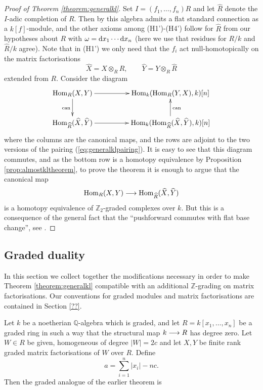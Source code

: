 \documentclass{compositio}
\theoremstyle{definition}
\numberwithin{equation}{section}
\def\can{\operatorname{can}}
\def\Hom{\operatorname{Hom}}
\begin{document}
\begin{proof}[Proof of Theorem \ref{theorem:generalkl}] Set $I = (f_1,\ldots,f_n)R$ and let $\widehat{R}$ denote the $I$-adic completion of $R$. Then by \cite{??} this algebra admits a flat standard connection as a $k[f]$-module, and the other axioms among (H1')-(H4') follow for $\widehat{R}$ from our hypotheses about $R$ with $\omega = \mathrm{d} x_1 \cdots \mathrm{d} x_n$ (here we use that residues for $R/k$ and $\widehat{R}/k$ agree). Note that in (H1') we only need that the $f_i$ act null-homotopically on the matrix factorisations
\[
\widehat{X} = X \otimes_R \widehat{R}, \qquad \widehat{Y} = Y \otimes_R \widehat{R}
\]
extended from $R$. Consider the diagram
\[
\xymatrix@C+2pc{
\Hom_R(X,Y) \ar[d]_{\can} \ar[r] & \Hom_k( \Hom_R(Y,X), k )[n]\\
\Hom_{\widehat{R}}(\widehat{X}, \widehat{Y}) \ar[r] & \Hom_k( \Hom_{\widehat{R}}(\widehat{X}, \widehat{Y}), k)[n] \ar[u]_{\can}
}
\]
where the columns are the canonical maps, and the rows are adjoint to the two versions of the pairing (\ref{eq:generalklpairing}). It is easy to see that this diagram commutes, and as the bottom row is a homotopy equivalence by Proposition \ref{prop:almostkltheorem}, to prove the theorem it is enough to argue that the canonical map
\[
\Hom_R(X,Y) \lto \Hom_{\widehat{R}}(\widehat{X}, \widehat{Y})
\]
is a homotopy equivalence of $\mathbb{Z}_2$-graded complexes over $k$. But this is a consequence of the general fact that the ``pushforward commutes with flat base change'', see \cite[Remark 7.7]{??}.
\end{proof}

\subsection{Graded duality}\label{section:gradedduality}

In this section we collect together the modifications necessary in order to make Theorem \ref{theorem:generalkl} compatible with an additional $\mathbb{Z}$-grading on matrix factorisations. Our conventions for graded modules and matrix factorisations are contained in Section \ref{??}.

Let $k$ be a noetherian $\mathbb{Q}$-algebra which is graded, and let $R = k[x_1,\ldots,x_n]$ be a graded ring in such a way that the structural map $k \longrightarrow R$ has degree zero. Let $W \in R$ be given, homogeneous of degree $|W| = 2c$ and let $X,Y$ be finite rank graded matrix factorisations of $W$ over $R$. Define
\[
a = \sum_{i=1}^n |x_i| - nc.
\]
Then the graded analogue of the earlier theorem is
\end{document}
